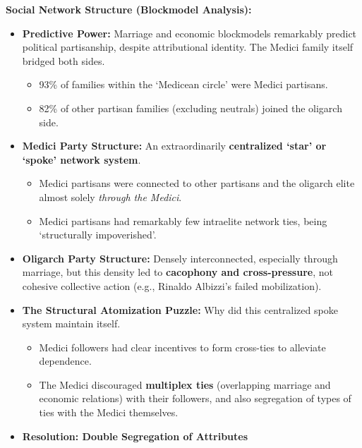 \documentclass{article}
\begin{document}
    \noindent \textbf{Social Network Structure (Blockmodel Analysis):}
    \begin{itemize}
        \item \textbf{Predictive Power:} Marriage and economic blockmodels
        remarkably predict political partisanship, despite attributional
        identity. The Medici family itself bridged both sides.
        \begin{itemize}
            \item 93\% of families within the `Medicean circle' were Medici
            partisans.
            \item 82\% of other partisan families (excluding neutrals)
            joined the oligarch side.
        \end{itemize}
        \item \textbf{Medici Party Structure:} An extraordinarily
        \textbf{centralized `star' or `spoke' network system}.
        \begin{itemize}
            \item Medici partisans were connected to other partisans and the
            oligarch elite almost solely \textit{through the Medici}.
            \item Medici partisans had remarkably few intraelite network
            ties, being `structurally impoverished'.
        \end{itemize}
        \item \textbf{Oligarch Party Structure:} Densely interconnected,
        especially through marriage, but this density led to
        \textbf{cacophony and cross-pressure}, not cohesive collective
        action (e.g., Rinaldo Albizzi's failed mobilization).
        \item \textbf{The Structural Atomization Puzzle:} Why did this
        centralized spoke system maintain itself.
        \begin{itemize}
            \item Medici followers had clear incentives to form cross-ties
            to alleviate dependence.
            \item The Medici discouraged
            \textbf{multiplex ties} (overlapping marriage and economic relations) with their followers, and also segregation of types of ties with the Medici themselves.
        \end{itemize}
        \item \textbf{Resolution: Double Segregation of Attributes}
        \begin{itemize}

\end{itemize}
\end{itemize}
\end{document}
